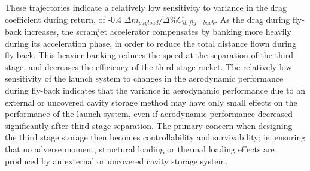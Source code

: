 These trajectories indicate a relatively low sensitivity to variance in the drag coefficient during return, of -0.4 $\Delta m_{payload}/\Delta$\%$C_{d,fly-back}$. As the drag during fly-back increases, the scramjet accelerator compensates by banking more heavily during its acceleration phase, in order to reduce the total distance flown during fly-back. This heavier banking reduces the speed at the separation of the third stage, and decreases the efficiency of the third stage rocket.
The relatively low sensitivity of the launch system to changes in the aerodynamic performance during fly-back indicates that the variance in aerodynamic performance due to an external or uncovered cavity storage method may have only small effects on the performance of the launch system, even if aerodynamic performance decreased significantly after third stage separation. The primary concern when designing the third stage storage then becomes controllability and survivability; ie. ensuring that no adverse moment, structural loading or thermal loading effects are produced by an external or uncovered cavity storage system. 
